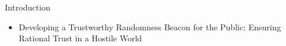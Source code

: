 \begin{frame}{Introduction}
    \begin{itemize}
        \item Developing a Trustworthy Randomness Beacon for the Public: Ensuring Rational Trust in a Hostile World
    \end{itemize}
\end{frame}
